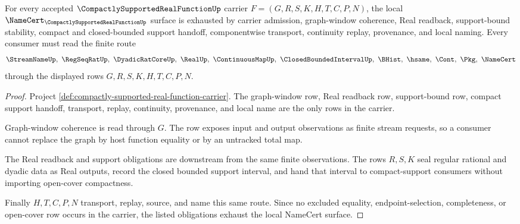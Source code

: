 \begin{theorem}
\label{thm:compactly-supported-real-function-namecert-obligations}
For every accepted $\CompactlySupportedRealFunctionUp$ carrier $F=(G,R,S,K,H,T,C,P,N)$, the local $\NameCert_{\CompactlySupportedRealFunctionUp}$ surface is exhausted by carrier admission, graph-window coherence, Real readback, support-bound stability, compact and closed-bounded support handoff, componentwise transport, continuity replay, provenance, and local naming. Every consumer must read the finite route
$$
\StreamNameUp,\ \RegSeqRatUp,\ \DyadicRatCoreUp,\ \RealUp,\ \ContinuousMapUp,\ \ClosedBoundedIntervalUp,\ \BHist,\ \hsame,\ \Cont,\ \Pkg,\ \NameCert
$$
through the displayed rows $G,R,S,K,H,T,C,P,N$.
\end{theorem}
\begin{proof}
Project \autoref{def:compactly-supported-real-function-carrier}. The graph-window row, Real readback row, support-bound row, compact support handoff, transport, replay, continuity, provenance, and local name are the only rows in the carrier.

Graph-window coherence is read through $G$. The row exposes input and output observations as finite stream requests, so a consumer cannot replace the graph by host function equality or by an untracked total map.

The Real readback and support obligations are downstream from the same finite observations. The rows $R,S,K$ seal regular rational and dyadic data as Real outputs, record the closed bounded support interval, and hand that interval to compact-support consumers without importing open-cover compactness.

Finally $H,T,C,P,N$ transport, replay, source, and name this same route. Since no excluded equality, endpoint-selection, completeness, or open-cover row occurs in the carrier, the listed obligations exhaust the local NameCert surface.
\end{proof}

